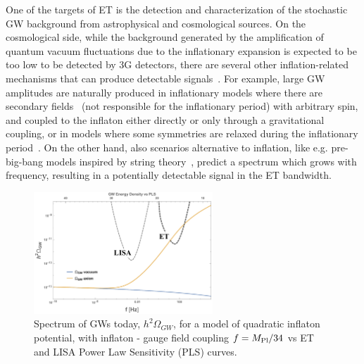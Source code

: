 One of the targets of ET is the detection and characterization of the stochastic GW background from astrophysical and cosmological sources. On the cosmological side, while the background  generated  by the amplification of quantum vacuum fluctuations due to the inflationary expansion is expected to be too low to be detected by  3G detectors, there are several other inflation-related mechanisms that can produce detectable signals~\cite{Maggiore:1999vm, Caprini:2018mtu, Maggiore:2018zz}. For example, 
large GW amplitudes are naturally produced in inflationary models where there are secondary
fields~\cite{Cook:2011hg} (not responsible for the inflationary period) with arbitrary
spin, and coupled to the inflaton either directly or only through a gravitational coupling, or in models where some symmetries are relaxed during the inflationary period~\cite{Bartolo:2015qvr}. On the other hand, also scenarios alternative to inflation, like e.g. pre-big-bang models inspired by string theory~\cite{Brustein:1995ah,Buonanno:1996xc, Gasperini:2002bn}, predict a spectrum which grows with frequency, resulting in a potentially detectable signal in the ET bandwidth. 


\begin{figure}[t!]
\begin{center}
\includegraphics[width=0.6\textwidth]{Figures/OGWvsPLS.pdf}
\end{center}
\caption{Spectrum of GWs today, $h^2 \Omega_{GW}$, for a model of quadratic inflaton potential, with inflaton - gauge field coupling $f = M_{\rm Pl}/34$ vs ET and LISA Power Law Sensitivity (PLS) curves.}
\label{fig:omegaaxion}
\end{figure}




